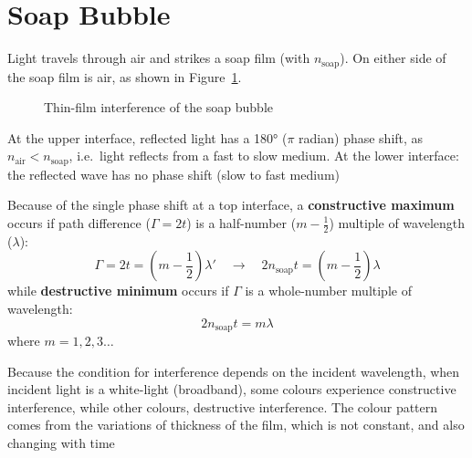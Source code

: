 \section{Soap Bubble}
Light travels through air and strikes a soap film (with $n_\text{soap}$). On
either side of the soap film is air, as shown in Figure~\ref{fig:soap-bubble}.
\begin{figure}[ht]
  \centering
  \caption{Thin-film interference of the soap bubble}
  \label{fig:soap-bubble}
\end{figure}
At the upper interface, reflected light has a \ang{180} ($\pi$ radian)
phase shift, as $n_\text{air}<n_\text{soap}$, i.e.\ light reflects from a
fast to slow medium. At the lower interface: the reflected wave has no phase
shift (slow to fast medium)

Because of the single phase shift at a top interface, a
\textbf{constructive maximum} occurs if path difference ($\Gamma=2t$) is a
half-number ($m-\frac12$) multiple of wavelength ($\lambda$):
\begin{equation}
  \Gamma=2t=\left(m-\frac12\right)\lambda'
  \quad\rightarrow\quad
  \boxed{
    2n_\text{soap}t=\left(m-\frac12\right)\lambda
  }
\end{equation}
while \textbf{destructive minimum} occurs if $\Gamma$ is a whole-number
multiple of wavelength:
\begin{equation}
  \boxed{
    2n_\text{soap}t=m\lambda
  }
\end{equation}
where $m=1,2,3\ldots$
%
%
%
%

Because the condition for interference depends on the incident wavelength, when
incident light is a white-light (broadband), some colours experience
constructive interference, while other colours, destructive interference.
The colour pattern comes from the variations of thickness of the film, which is
not constant, and also changing with time




